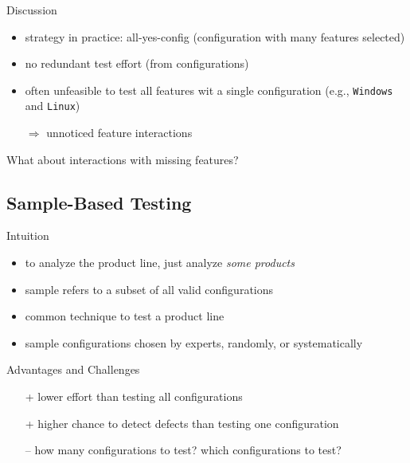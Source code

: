 \begin{frame}[b]{\myframetitle{}}
\begin{mycolumns}[b]
\begin{note}{Discussion}
\begin{itemize}
				\item strategy in practice: all-yes-config (configuration with many features selected)
				\item no redundant test effort (from configurations)
				\vspace*{1ex}
				\item often unfeasible to test all features wit a single configuration (e.g., \texttt{Windows} and \texttt{Linux})
				\item[$\Rightarrow$] unnoticed feature interactions\mysource{\lectureinteractions}
			\end{itemize}
		\end{note}
		\pause
		\begin{example}{What about interactions with missing features?}
			\centering{}
		\end{example}
	\end{mycolumns}
\end{frame}

\subsection{Sample-Based Testing}
\begin{frame}{\myframetitle{} }
	\begin{mycolumns}
		\begin{definition}{Intuition}
			\begin{itemize}
				\item to analyze the product line, just analyze \emph{some products}
				\item sample  refers to a subset of all valid configurations
				\item common technique to test a product line
				\item sample configurations chosen by experts, randomly, or systematically
			\end{itemize}
		\end{definition}
		\pause
		\begin{note}{Advantages and Challenges}
			\begin{itemize}
				\item[+] lower effort than testing all configurations
				\item[+] higher chance to detect defects than testing one configuration
				\item[--] how many configurations to test? which configurations to test?
			\end{itemize}
		\end{note}
	\mynextcolumn
		\pause
	\end{mycolumns}
\end{frame}

